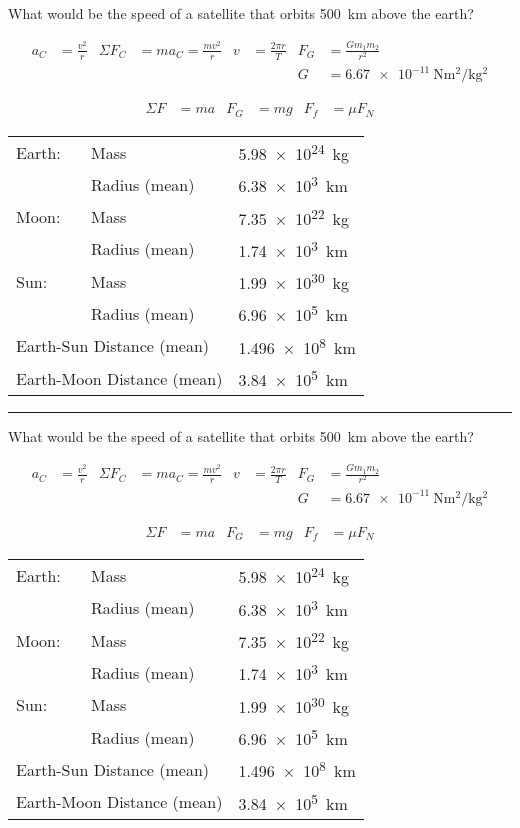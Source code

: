 \documentclass[12pt]{exam}
\begin{document}
\newcommand{\qu}{
  What would be the speed of a satellite that orbits 500~km above the earth?


  \begin{align*}
    a_C        &= \frac{v^2}{r} &
    \Sigma F_C &= ma_C = \frac{mv^2}{r}  &
    v          &= \frac{2\pi r}{T} &
    F_G        &= \frac{Gm_1 m_2}{r^2} \\
    &&&&&& G   &= \SI{6.67e-11}
                  {\newton\meter^2\per\kilo\gram^2}
  \end{align*}


  \begin{align*}
    \Sigma F &= ma &
    F_G      &= mg &
    F_f      &= \mu F_N
  \end{align*}


  \begin{center}
    \begin{tabular}{lll}
      \hline
      Earth: & Mass           & \SI{5.98e24}{\kilo\gram} \\
            & Radius (mean)  & \SI{6.38e3}{\kilo\meter} \\
      Moon:  & Mass           & \SI{7.35e22}{\kilo\gram} \\
            & Radius (mean)  & \SI{1.74e3}{\kilo\meter} \\
      Sun:   & Mass           & \SI{1.99e30}{\kilo\gram} \\
            & Radius (mean)  & \SI{6.96e5}{\kilo\meter} \\ \hline
      \multicolumn{2}{l}{Earth-Sun Distance (mean)} & 
                                \SI{1.496e8}{\kilo\meter} \\
      \multicolumn{2}{l}{Earth-Moon Distance (mean)} & 
                                \SI{3.84e5}{\kilo\meter} \\
                                \hline\hline
    \end{tabular}
  \end{center}
}


\qu
\vs
\hrule
\vs
\qu


  
\end{document}

